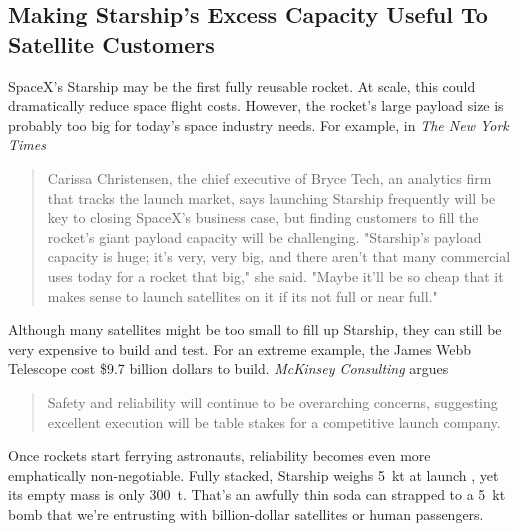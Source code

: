 \documentclass{article}
\begin{document}
{\subsection{Making Starship's Excess Capacity Useful To Satellite Customers} \label{sec:starship_safelaunch}

SpaceX's Starship may be the first fully reusable rocket. At scale, this could dramatically reduce space flight costs.   However, the rocket's large payload size is probably too big for today's space industry needs. For example, in \textit{The New York Times}

\begin{quote}
Carissa Christensen, the chief executive of Bryce Tech, an analytics firm that tracks the launch market, says launching Starship frequently will be key to closing SpaceX’s business case, but finding customers to fill the rocket’s giant payload capacity will be challenging. 
"Starship's payload capacity is huge; it's very, very big, and there aren't that many commercial uses today for a rocket that big," she said.  "Maybe it'll be so cheap that it makes sense to launch satellites on it if its not full or near full."  \cite{nyt_starship_size}
\end{quote}

Although many satellites might be too small to fill up Starship, they can still be very expensive to build and test. For an extreme example, the James Webb Telescope \cite{james_webb_space_telescope} cost \$9.7 billion dollars \cite{jwst_cost} to build. \textit{McKinsey Consulting} argues 

\begin{quote}
Safety and reliability will continue to be overarching concerns, suggesting excellent execution will be table stakes for a competitive launch company. \cite{mckinsey_reliability}
\end{quote}

Once rockets start ferrying astronauts, reliability becomes even more emphatically non-negotiable. Fully stacked, Starship weighs \SI{5}{\kilo\tonne} at launch \cite{starship}, yet its empty mass is only \SI{300}{\tonne}. That’s an awfully thin soda can strapped to a \SI{5}{\kilo\tonne} bomb that we're entrusting with billion-dollar satellites or human passengers.

}
\end{document}
